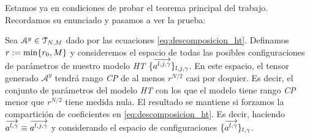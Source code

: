 Estamos ya en condiciones de probar el teorema principal del trabajo. Recordamos su enunciado y pasamos a ver la prueba:

\begin{teorema} \label{teorema:teorema_principal_especificacion}
    Sea $\mathcal{A}^y \in \mathcal{T}_{N, M}$ dado por las ecuaciones \eqref{eq:descomposicion_ht}. Definamos $r := \min \{ r_0, M \}$ y consideremos el espacio de todas las posibles configuraciones de parámetros de nuestro modelo \textit{HT} $\{  \overrightarrow{a^{l, j, \gamma}} \}_{l, j, \gamma}$. En este espacio, el tensor generado $\mathcal{A}^y$ tendrá rango \textit{CP} de al menos $r^{N/2}$ casi por doquier. Es decir, el conjunto de parámetros del modelo \textit{HT} con los que el modelo tiene rango \textit{CP} menor que $r^{N/2}$ tiene medida nula. El resultado se mantiene si forzamos la compartición de coeficientes en \eqref{eq:descomposicion_ht}. Es decir, haciendo $\overrightarrow{a^{l, \gamma}} \equiv \overrightarrow{a^{l, j, \gamma}}$ y considerando el espacio de configuraciones $\{ \overrightarrow{a^{l, \gamma}}  \}_{l, \gamma}$.
\end{teorema}

